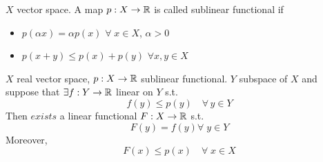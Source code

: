 \begin{definition}
    \(X\) vector space. A map \(p: X \to \mathbb{R}\) is called sublinear functional if 
    \begin{itemize}
        \item \(p(\alpha x) = \alpha p(x) \) \(\forall \; x \in X\), \(\alpha >0\)
        \item \(p(x+y) \leq p(x) + p(y)\) \(\forall x, y \in X\)  
    \end{itemize}
\end{definition}

\begin{theorem}
    \(X\) real vector space, \(p:X \to \mathbb{R}\) sublinear functional. 
    \(Y\) subspace of \(X\) and suppose that \(\exists f: Y \to \mathbb{R} \) linear on \(Y\) s.t. 
    \[
        f(y) \leq p(y) \quad \forall \, y \in Y
    \]
    Then \(exists\) a linear functional \(F: X \to \mathbb{R} \) s.t. 
    \[
        F(y) = f(y) \forall \; y \in Y \tag*{\(F\) is anm extension of \(f\)}
    \]
    Moreover,
    \[
        F(x) \leq p(x) \quad \forall \; x \in X
    \] 
\end{theorem}
